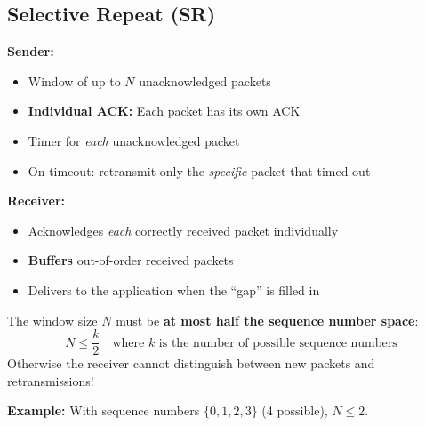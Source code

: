 \begin{center}
\end{center}

\begin{imagebox}
\end{imagebox}

\subsection{Selective Repeat (SR)}

\begin{keybox}
\textbf{Sender:}
\begin{itemize}[noitemsep]
    \item Window of up to $N$ unacknowledged packets
    \item \textbf{Individual ACK:} Each packet has its own ACK
    \item Timer for \emph{each} unacknowledged packet
    \item On timeout: retransmit only the \emph{specific} packet that timed out
\end{itemize}

\textbf{Receiver:}
\begin{itemize}[noitemsep]
    \item Acknowledges \emph{each} correctly received packet individually
    \item \textbf{Buffers} out-of-order received packets
    \item Delivers to the application when the ``gap'' is filled in
\end{itemize}
\end{keybox}

\begin{warnbox}
The window size $N$ must be \textbf{at most half the sequence number space}:
\[
N \leq \frac{k}{2} \quad \text{where } k \text{ is the number of possible sequence numbers}
\]
Otherwise the receiver cannot distinguish between new packets and retransmissions!

\textbf{Example:} With sequence numbers $\{0, 1, 2, 3\}$ (4 possible), $N \leq 2$.
\end{warnbox}

